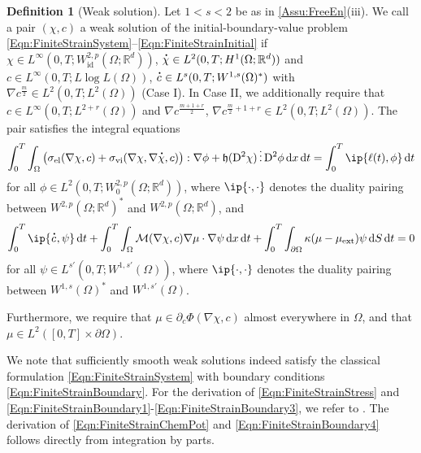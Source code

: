 \documentclass[a4paper,12pt]{article}
\newcommand{\el}{\text{el}}
\newcommand{\vi}{\text{vi}}
\newcommand{\ext}{\mathrm{ext}}
\newcommand{\R}{\mathbb{R}}
\newcommand{\calM}{\mathcal{M}}
\newcommand{\pl}{\partial}
\newcommand{\dx}{\mathrm{\,d}x}
\newcommand{\dt}{\mathrm{\,d}t}
\newcommand{\dGamma}{\mathrm{\,d}S}%
\newcommand{\id}{\mathrm{id}}
\newcommand\DT[1]{\mathchoice
                 {{\buildrel{\hspace*{.1em}\text{\LARGE.}}\over{#1}}}
                 {{\buildrel{\hspace*{.1em}\text{\Large.}}\over{#1}}}
                 {{\buildrel{\hspace*{.1em}\text{\large.}}\over{#1}}}
                 {{\buildrel{\hspace*{.1em}\text{\large.}}\over{#1}}}}
\renewcommand{\dot}{\DT}
\newcommand{\rmD}{\mathrm{D}}
\newcommand{\mfh}{\mathfrak{h}}
\theoremstyle{plain}
\theoremstyle{definition}
\newtheorem{Def}[Th]{Definition}
\newcommand{\tdots}{\,\vdots\,}
\numberwithin{equation}{section}
\begin{document}
	
	\begin{Def}[Weak solution]
		\label{Def:weakSolutionFiniteStrain}
		Let $1<s<2$ be as in \ref{Assu:FreeEn}(iii). We call a pair $(\chi,c)$ a weak solution of the  
		initial-boundary-value problem \eqref{Eqn:FiniteStrainSystem}--\eqref{Eqn:FiniteStrainInitial}
		if $\chi\in L^\infty(0,T;W^{2,p}_\id(\Omega;\R^d))$, $\dot\chi\in L^2(0,T;H^1(\Omega;\R^d))$ and $c\in L^\infty(0,T;L\log L(\Omega))$, $\dot c \in L^s(0,T;W^{1,s}(\Omega)^*)$ with $\nabla c^{\frac{m}{2}}\in L^2(0,T;L^2(\Omega))$ (Case I). In Case II, we additionally require that $c\in L^\infty(0,T;L^{2+r}(\Omega))$ and $\nabla c^{\frac{m+1+r}{2}}$, $\nabla c^{\frac{m}{2}+1+r}\in L^2(0,T;L^2(\Omega))$. The pair satisfies the integral equations 
		\begin{subequations}
        \begin{equation}
		\label{Eqn:FiniteStrain:WeakSoln:chi}
		\int_0^T\int_\Omega \big(\sigma_\el(\nabla\chi,c) + \sigma_\vi(\nabla\chi,\nabla\dot\chi,c)\big) : \nabla \phi 
		+ \mfh(\rmD^2\chi)\tdots \rmD^2\phi\dx\dt 
		= \int_0^T \ip{\ell(t),\phi}\dt
		\end{equation} 
		\end{subequations}
        for all %
		$\phi\in L^2(0,T;W_0^{2,p}(\Omega;\R^d))$, where $\ip{\cdot,\cdot}$ denotes the duality pairing between $W^{2,p}(\Omega;\R^d)^*$ and $W^{2,p}(\Omega;\R^d)$, %
        and
		\begin{equation}
		\label{Eqn:FiniteStrain:WeakSoln:mu}
		\int_0^T \ip{\dot c,\psi}\dt + \int_0^T\int_\Omega\calM(\nabla\chi,c)\nabla\mu \cdot \nabla \psi \dx\dt + \int_0^T\int_{\pl\Omega} \kappa(\mu - \mu_\ext)\psi\dGamma\dt = 0
		\end{equation} 
		for all $\psi\in L^{s'}(0,T;W^{1,s'}(\Omega))$, where $\ip{\cdot,\cdot}$ denotes the duality pairing between $W^{1,s}(\Omega)^*$ and $W^{1,s'}(\Omega)$.
  
		Furthermore, we require that $\mu\in \pl_c\Phi(\nabla\chi,c)$ almost everywhere in $\Omega$, and that $\mu\in L^2([0,T]\times\pl\Omega)$.
	\end{Def}
	
    We note that sufficiently smooth weak solutions indeed satisfy the classical formulation \eqref{Eqn:FiniteStrainSystem} with boundary conditions \eqref{Eqn:FiniteStrainBoundary}. For the derivation of \eqref{Eqn:FiniteStrainStress} and \eqref{Eqn:FiniteStrainBoundary1}-\eqref{Eqn:FiniteStrainBoundary3}, we refer to \cite[Eqn. (2.28)-(2.29)]{MieRou2020TVKVR}. The derivation of \eqref{Eqn:FiniteStrainChemPot} and \eqref{Eqn:FiniteStrainBoundary4} follows directly from integration by parts.
 
\end{document}

